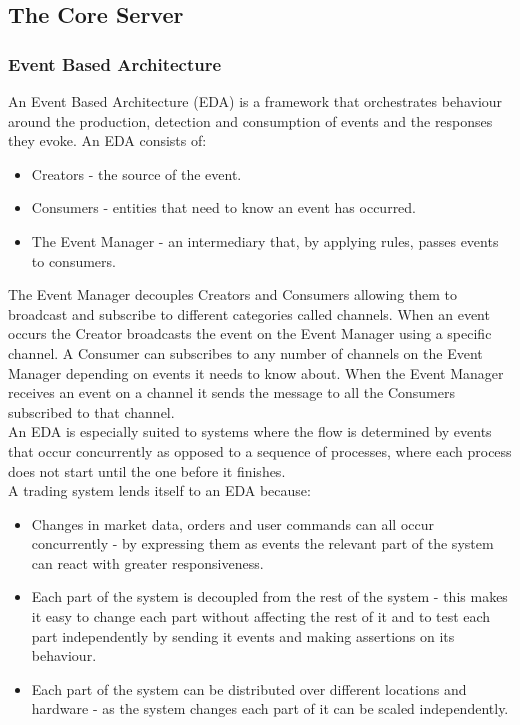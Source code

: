\subsection{The Core Server}		
	\subsubsection{Event Based Architecture}
	An Event Based Architecture (EDA) is a framework that orchestrates behaviour around the production, detection and consumption of events and the responses they evoke. An EDA consists of:
	
	\begin{itemize}
		\item Creators - the source of the event.
		\item Consumers - entities that need to know an event has occurred.
		\item The Event Manager - an intermediary that, by applying rules, passes events to consumers.
	\end{itemize}
	
	The Event Manager decouples Creators and Consumers allowing them to broadcast and subscribe to different categories called channels. When an event occurs the Creator broadcasts the event on the Event Manager using a specific channel. A Consumer can subscribes to any number of channels on the Event Manager depending on events it needs to know about. When the Event Manager receives an event on a channel it sends the message to all the Consumers subscribed to that channel.\\
	
	An EDA is especially suited to systems where the flow is determined by events that occur concurrently as opposed to a sequence of processes, where each process does not start until the one before it finishes.\\
	
	A trading system lends itself to an EDA because: 

		\begin{itemize}
			\item Changes in market data, orders and user commands can all occur concurrently - by expressing them as events the relevant part of the system can react with greater responsiveness.
			\item Each part of the system is decoupled from the rest of the system - this makes it easy to change each part without affecting the rest of it and to test each part independently by sending it events and making assertions on its behaviour.
			\item Each part of the system can be distributed over different locations and hardware - as the system changes each part of it can be scaled independently.
		\end{itemize}			
	
